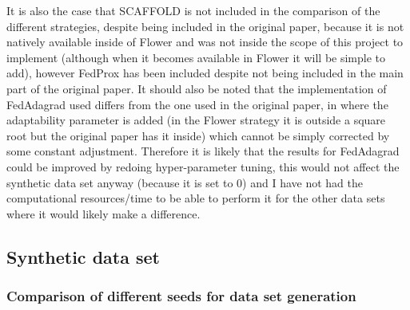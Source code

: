 \documentclass{article}
\begin{document}
It is also the case that SCAFFOLD is not included in the comparison of the different strategies, despite being included in the original paper, because it is not natively available inside of Flower and was not inside the scope of this project to implement (although when it becomes available in Flower it will be simple to add), however FedProx has been included despite not being included in the main part of the original paper.  It should also be noted that the implementation of FedAdagrad used differs from the one used in the original paper, in where the adaptability parameter is added (in the Flower strategy it is outside a square root but the original paper has it inside) which cannot be simply corrected by some constant adjustment.  Therefore it is likely that the results for FedAdagrad could be improved by redoing hyper-parameter tuning, this would not affect the synthetic data set anyway (because it is set to 0) and I have not had the computational resources/time to be able to perform it for the other data sets where it would likely make a difference.

\subsection{Synthetic data set}

\subsubsection{Comparison of different seeds for data set generation}
\end{document}
